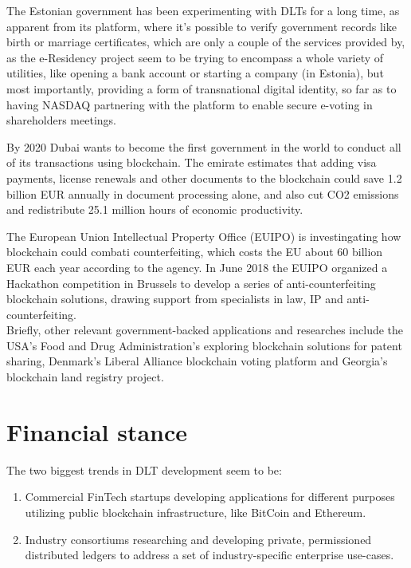 The Estonian government has been experimenting with DLTs for a long time, as apparent from its \cite{eresidency} platform, where it's possible to verify government records like birth or marriage certificates, which are only a couple of the services provided by, as the e-Residency project seem to be trying to encompass a whole variety of utilities, like opening a bank account or starting a company (in Estonia), but most importantly, providing a form of transnational digital identity, so far as to having NASDAQ partnering with the platform to enable secure e-voting in shareholders meetings.

By 2020 Dubai wants to become the first government in the world to conduct all of its transactions using blockchain. The emirate estimates that adding visa payments, license renewals and other documents to the blockchain could save 1.2 billion EUR annually in document processing alone, and also cut CO2 emissions and redistribute 25.1 million hours of economic productivity.

The European Union Intellectual Property Office (EUIPO) is investingating how blockchain could combati counterfeiting, which costs the EU about 60 billion EUR each year according to the agency. In June 2018 the EUIPO organized a Hackathon competition in Brussels to develop a series of anti-counterfeiting blockchain solutions, drawing support from specialists in law, IP and anti-counterfeiting. \\

Briefly, other relevant government-backed applications and researches include the USA's Food and Drug Administration's exploring blockchain solutions for patent sharing, Denmark's Liberal Alliance blockchain voting platform and Georgia's blockchain land registry project. 


\section{Financial stance}

The two biggest trends in DLT development seem to be:
\begin{enumerate}
    \item Commercial FinTech startups developing applications for different purposes utilizing public blockchain infrastructure, like BitCoin and Ethereum.
    \item Industry consortiums researching and developing private, permissioned distributed ledgers to address a set of industry-specific enterprise use-cases.
\end{enumerate}

